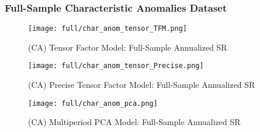 \subsubsection{Full-Sample Characteristic Anomalies Dataset}

\begin{figure}[H]
    \centering
    \texttt{[image: full/char\_anom\_tensor\_TFM.png]}
    \caption{(CA) Tensor Factor Model: Full-Sample Annualized SR}
    \label{fig:char_anom-primary-tfm}
\end{figure}

\begin{figure}[H]
    \centering
    \texttt{[image: full/char\_anom\_tensor\_Precise.png]}
    \caption{(CA) Precise Tensor Factor Model: Full-Sample Annualized SR}
    \label{fig:char_anom-primary-precise}
\end{figure}


\begin{figure}[H]
    \centering
    \texttt{[image: full/char\_anom\_pca.png]}
    \caption{(CA) Multiperiod PCA Model: Full-Sample Annualized SR}
    \label{fig:char_anom-primary-pca}
\end{figure}
